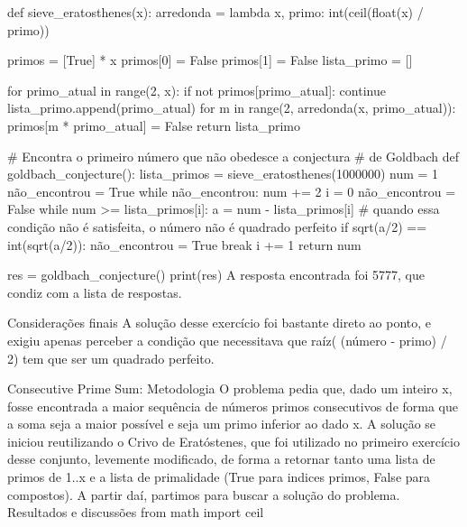             def sieve_eratosthenes(x):
                arredonda = lambda x, primo: int(ceil(float(x) / primo))

                primos = [True] * x
                primos[0] = False
                primos[1] = False
                lista_primo = []

                for primo_atual in range(2, x):
                    if not primos[primo_atual]:
                        continue
                    lista_primo.append(primo_atual)
                    for m in range(2, arredonda(x, primo_atual)):
                        primos[m * primo_atual] = False
                return lista_primo

            # Encontra o primeiro número que não obedesce a conjectura
            # de Goldbach
            def goldbach_conjecture():
                lista_primos = sieve_eratosthenes(1000000)
                num = 1
                não_encontrou = True
                while não_encontrou:
                    num += 2
                    i = 0
                    não_encontrou = False
                    while num >= lista_primos[i]:
                        a = num - lista_primos[i]
                        # quando essa condição não é satisfeita, o número não é quadrado perfeito
                        if sqrt(a/2) == int(sqrt(a/2)):
                            não_encontrou = True
                            break
                        i += 1
                return num

            res = goldbach_conjecture()
            print(res)
            A resposta encontrada foi 5777, que condiz com a lista de respostas.

        Considerações finais
            A solução desse exercício foi bastante direto ao ponto, e exigiu apenas perceber a condição que necessitava que raíz( (número - primo) / 2) tem que ser um quadrado perfeito.
    
    Consecutive Prime Sum:
        Metodologia
            O problema pedia que, dado um inteiro x, fosse encontrada a maior sequência de números primos consecutivos de forma que a soma seja a maior possível e seja um primo inferior ao dado x.
            A solução se iniciou reutilizando o Crivo de Eratóstenes, que foi utilizado no primeiro exercício desse conjunto, levemente modificado, de forma a retornar tanto uma lista de primos de 1..x e a lista de primalidade (True para indices primos, False para compostos).
            A partir daí, partimos para buscar a solução do problema.
        Resultados e discussões
            from math import ceil

